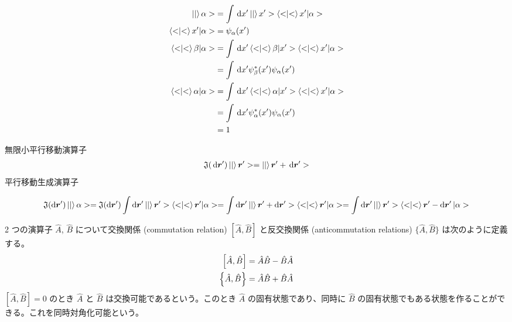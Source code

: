 \documentclass[uplatex,dvipdfmx,a4paper,11pt]{jlreq}
\newcommand{\rr}{\bm{r}}
\numberwithin{equation}{section}
\theoremstyle{definition}
\begin{document}
\begin{proposition}
  \begin{align}
    \ket|\alpha>           & = \int\dl{x'}\ket|x'>\braket<x'|\alpha>           \\
    \braket<x'|\alpha>     & = \psi_{\alpha}(x')                               \\
    \braket<\beta|\alpha>  & = \int\dl{x'}\braket<\beta|x'>\braket<x'|\alpha>  \\
                           & = \int\dl{x'}\psi_{\beta}^*(x')\psi_{\alpha}(x')  \\
    \braket<\alpha|\alpha> & = \int\dl{x'}\braket<\alpha|x'>\braket<x'|\alpha> \\
                           & = \int\dl{x'}\psi_{\alpha}^*(x')\psi_{\alpha}(x') \\
                           & = 1
  \end{align}
\end{proposition}
\begin{definition}[平行移動]
  無限小平行移動演算子
  \begin{align}
    \mathfrak{J}(\dl{\rr'})\ket|\rr'> = \ket|\rr' + \dl{\rr'}>
  \end{align}
  平行移動生成演算子
\end{definition}
\begin{align}
  \mathfrak{J}(\dd{\rr'})\ket|\alpha> = \mathfrak{J}(\dd{\rr'})\int\dd{\rr'}\ket|\rr'>\braket<\rr'|\alpha> = \int\dd{\rr'}\ket|\rr' + \dd{\rr'}>\braket<\rr'|\alpha> = \int\dd{\rr'}\ket|\rr'>\braket<\rr' - \dd{\rr'}|\alpha>
\end{align}

\begin{definition}
  2 つの演算子 $\hat{A}$, $\hat{B}$ について交換関係 (commutation relation) $[\hat{A}, \hat{B}]$ と反交換関係 (anticommutation relations) $\lbrace\hat{A}, \hat{B}\rbrace$ は次のように定義する。
  \begin{align}
    \qty[\hat{A}, \hat{B}] & = \hat{A}\hat{B} - \hat{B}\hat{A} \\
    \qty{\hat{A}, \hat{B}} & = \hat{A}\hat{B} + \hat{B}\hat{A}
  \end{align}
  $[\hat{A}, \hat{B}] = 0$ のとき $\hat{A}$ と $\hat{B}$ は交換可能であるという。このとき $\hat{A}$ の固有状態であり、同時に $\hat{B}$ の固有状態でもある状態を作ることができる。これを同時対角化可能という。
\end{definition}
\end{document}
